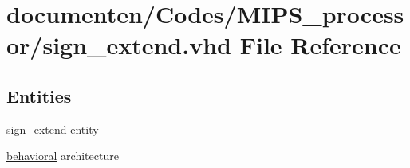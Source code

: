 \hypertarget{sign__extend_8vhd}{\section{documenten/\-Codes/\-M\-I\-P\-S\-\_\-processor/sign\-\_\-extend.vhd File Reference}
\label{sign__extend_8vhd}
}
\subsection*{Entities}
\begin{DoxyCompactItemize}
\item 
\hyperlink{classsign__extend}{sign\-\_\-extend} entity
\item 
\hyperlink{classsign__extend_1_1behavioral}{behavioral} architecture
\end{DoxyCompactItemize}
